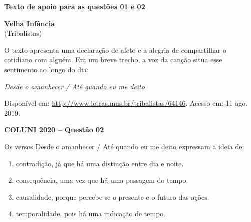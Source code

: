 \textbf{Texto de apoio para as questões 01 e 02}\par\medskip
\textbf{Velha Infância}\\
(Tribalistas)

O texto apresenta uma declaração de afeto e a alegria de compartilhar o cotidiano com alguém. Em um breve trecho, a voz da canção situa esse sentimento ao longo do dia:
\begin{center}\textit{Desde o amanhecer / Até quando eu me deito}\end{center}
Disponível em: \url{http://www.letras.mus.br/tribalistas/64146}. Acesso em: 11 ago. 2019.

\textbf{COLUNI 2020 -- Questão 02}\par\medskip Os versos \underline{Desde o amanhecer / Até quando eu me deito} expressam a ideia de:\begin{enumerate}
\item contradição, já que há uma distinção entre dia e noite.
\item consequência, uma vez que há uma passagem do tempo.
\item causalidade, porque percebe-se o presente e o futuro das ações.
\item temporalidade, pois há uma indicação de tempo.\end{enumerate}